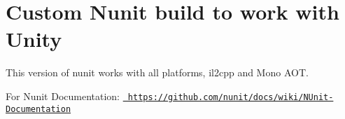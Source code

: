 \chapter{Custom Nunit build to work with Unity}
\hypertarget{md__hey_tea_9_2_library_2_package_cache_2com_8unity_8ext_8nunit_0d1_80_86_2_r_e_a_d_m_e}{}\label{md__hey_tea_9_2_library_2_package_cache_2com_8unity_8ext_8nunit_0d1_80_86_2_r_e_a_d_m_e}
\label{md__hey_tea_9_2_library_2_package_cache_2com_8unity_8ext_8nunit_0d1_80_86_2_r_e_a_d_m_e_autotoc_md910}%
%
 This version of nunit works with all platforms, il2cpp and Mono AOT.

For Nunit Documentation\+: \href{https://github.com/nunit/docs/wiki/NUnit-Documentation}{\texttt{ https\+://github.\+com/nunit/docs/wiki/\+NUnit-\/\+Documentation}} 